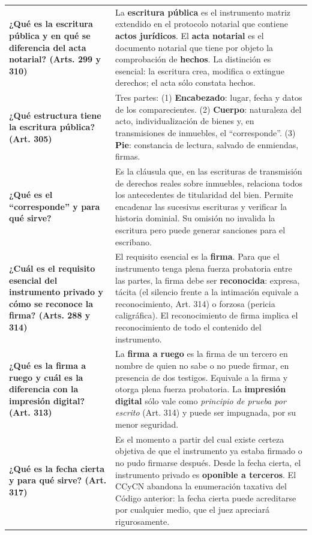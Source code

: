 \documentclass[12pt,oneside]{book}
\begin{document}
\begin{table}[H]
\begin{tabularx}{\textwidth}{
    >{\raggedright\arraybackslash}p{}
    >{\raggedright\arraybackslash}X
}
\textbf{¿Qué es la escritura pública y en qué se diferencia del acta notarial? (Arts. 299 y 310)} &
La \textbf{escritura pública} es el instrumento matriz extendido en el protocolo notarial que contiene \textbf{actos jurídicos}. El \textbf{acta notarial} es el documento notarial que tiene por objeto la comprobación de \textbf{hechos}. La distinción es esencial: la escritura crea, modifica o extingue derechos; el acta sólo constata hechos. \\[6pt]

\textbf{¿Qué estructura tiene la escritura pública? (Art. 305)} &
Tres partes: (1) \textbf{Encabezado}: lugar, fecha y datos de los comparecientes. (2) \textbf{Cuerpo}: naturaleza del acto, individualización de bienes y, en transmisiones de inmuebles, el ``corresponde''. (3) \textbf{Pie}: constancia de lectura, salvado de enmiendas, firmas. \\[6pt]

\textbf{¿Qué es el ``corresponde'' y para qué sirve?} &
Es la cláusula que, en las escrituras de transmisión de derechos reales sobre inmuebles, relaciona todos los antecedentes de titularidad del bien. Permite encadenar las sucesivas escrituras y verificar la historia dominial. Su omisión no invalida la escritura pero puede generar sanciones para el escribano. \\[6pt]

\textbf{¿Cuál es el requisito esencial del instrumento privado y cómo se reconoce la firma? (Arts. 288 y 314)} &
El requisito esencial es la \textbf{firma}. Para que el instrumento tenga plena fuerza probatoria entre las partes, la firma debe ser \textbf{reconocida}: expresa, tácita (el silencio frente a la intimación equivale a reconocimiento, Art. 314) o forzosa (pericia caligráfica). El reconocimiento de firma implica el reconocimiento de todo el contenido del instrumento. \\[6pt]

\textbf{¿Qué es la firma a ruego y cuál es la diferencia con la impresión digital? (Art. 313)} &
La \textbf{firma a ruego} es la firma de un tercero en nombre de quien no sabe o no puede firmar, en presencia de dos testigos. Equivale a la firma y otorga plena fuerza probatoria. La \textbf{impresión digital} sólo vale como \emph{principio de prueba por escrito} (Art. 314) y puede ser impugnada, por su menor seguridad. \\[6pt]

\textbf{¿Qué es la fecha cierta y para qué sirve? (Art. 317)} &
Es el momento a partir del cual existe certeza objetiva de que el instrumento ya estaba firmado o no pudo firmarse después. Desde la fecha cierta, el instrumento privado es \textbf{oponible a terceros}. El CCyCN abandona la enumeración taxativa del Código anterior: la fecha cierta puede acreditarse por cualquier medio, que el juez apreciará rigurosamente. \\[6pt]


\end{tabularx}
\end{table}
\end{document}
